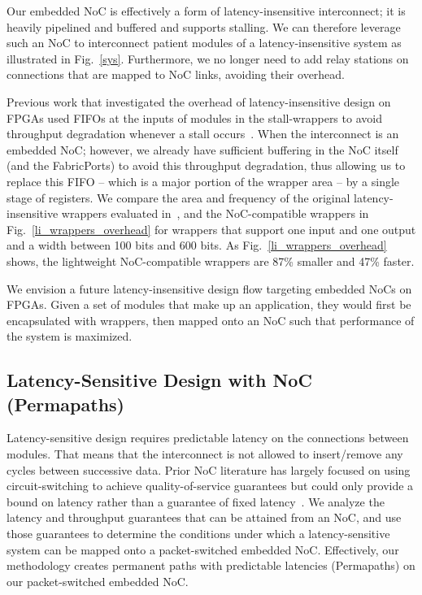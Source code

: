Our embedded NoC is effectively a form of latency-insensitive interconnect; it is heavily pipelined and buffered and supports stalling.
We can therefore leverage such an NoC to interconnect patient modules of a latency-insensitive system as illustrated in Fig.~\ref{sys}. 
Furthermore, we no longer need to add relay stations on connections that are mapped to NoC links, avoiding their overhead.

%
%

Previous work that investigated the overhead of latency-insensitive design on FPGAs used FIFOs at the inputs of modules in the stall-wrappers to avoid throughput degradation whenever a stall occurs~\cite{Murray2014}.
When the interconnect is an embedded NoC; however, we already have sufficient buffering in the NoC itself (and the FabricPorts) to avoid this throughput degradation, thus allowing us to replace this FIFO -- which is a major portion of the wrapper area -- by a single stage of registers.
We compare the area and frequency of the original latency-insensitive wrappers evaluated in~\cite{Murray2014}, and the NoC-compatible wrappers in Fig.~\ref{li_wrappers_overhead} for wrappers that support one input and one output and a width between 100 bits and 600 bits.
As Fig.~\ref{li_wrappers_overhead} shows, the lightweight NoC-compatible wrappers are 87\% smaller and 47\% faster.

We envision a future latency-insensitive design flow targeting embedded NoCs on FPGAs.
Given a set of modules that make up an application, they would first be encapsulated with wrappers, then mapped onto an NoC such that performance of the system is maximized.


%
\subsection{Latency-Sensitive Design with NoC\\(Permapaths)}
%

Latency-sensitive design requires predictable latency on the connections between modules.
That means that the interconnect is not allowed to insert/remove any cycles between successive data.
Prior NoC literature has largely focused on using circuit-switching to achieve quality-of-service guarantees but could only provide a bound on latency rather than a guarantee of fixed latency~\cite{Goossens2005}.
We analyze the latency and throughput guarantees that can be attained from an NoC, and use those guarantees to determine the conditions under which a latency-sensitive system can be mapped onto a packet-switched embedded NoC.
Effectively, our methodology creates permanent paths with predictable latencies (Permapaths) on our packet-switched embedded NoC.

